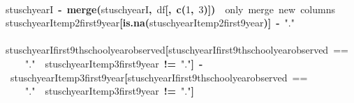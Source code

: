 \documentclass[12pt]{article}
\makeatletter
\newcommand{\hlnumber}[1]{\textcolor[rgb]{0,0,0}{#1}}%
\newcommand{\hlfunctioncall}[1]{\textcolor[rgb]{0.501960784313725,0,0.329411764705882}{\textbf{#1}}}%
\newcommand{\hlstring}[1]{\textcolor[rgb]{0.6,0.6,1}{#1}}%
\newcommand{\hlkeyword}[1]{\textcolor[rgb]{0,0,0}{\textbf{#1}}}%
\newcommand{\hlcomment}[1]{\textcolor[rgb]{0.180392156862745,0.6,0.341176470588235}{#1}}%
\newcommand{\hlassignement}[1]{\textcolor[rgb]{0,0,0}{\textbf{#1}}}%
\newcommand{\hlsymbol}[1]{\textcolor[rgb]{0,0,0}{#1}}%
\newcommand{\hlstd}[1]{\textcolor[rgb]{0,0,0}{#1}}%
\newenvironment{kframe}{%
 \def\FrameCommand##1{\hskip\@totalleftmargin \hskip-\fboxsep
 \colorbox{shadecolor}{##1}\hskip-\fboxsep
     \hskip-\linewidth \hskip-\@totalleftmargin \hskip\columnwidth}%
 \MakeFramed {\advance\hsize-\width
   \@totalleftmargin\z@ \linewidth\hsize
   \@setminipage}}%
 {\par\unskip\endMakeFramed}
\newenvironment{knitrout}{}{} %
\renewenvironment{knitrout}{\begin{footnotesize}}{\end{footnotesize}}
\makeatother
\begin{document}
\begin{knitrout}
\begin{kframe}
\begin{flushleft}
\hlstd{}\hspace*{\fill}\\
\hlstd{}\hlsymbol{stuschyearI}{\ }\hlassignement{\usebox{\hlnormalsizeboxlessthan}-}{\ }\hlfunctioncall{merge}\hlkeyword{(}\hlsymbol{stuschyearI}\hlkeyword{,}{\ }\hlsymbol{df}\hlkeyword{[}\hlkeyword{,}{\ }\hlfunctioncall{c}\hlkeyword{(}\hlnumber{1}\hlkeyword{,}{\ }\hlnumber{3}\hlkeyword{)}\hlkeyword{]}\hlkeyword{)}{\ }{\ }\hlcomment{\usebox{\hlnormalsizeboxhash}{\ }only{\ }merge{\ }new{\ }columns}\hspace*{\fill}\\
\hlstd{}\hlsymbol{stuschyearI}\hlkeyword{\usebox{\hlnormalsizeboxdollar}}\hlsymbol{temp2\usebox{\hlnormalsizeboxunderscore}first9year}\hlkeyword{[}\hlfunctioncall{is.na}\hlkeyword{(}\hlsymbol{stuschyearI}\hlkeyword{\usebox{\hlnormalsizeboxdollar}}\hlsymbol{temp2\usebox{\hlnormalsizeboxunderscore}first9year}\hlkeyword{)}\hlkeyword{]}{\ }\hlassignement{\usebox{\hlnormalsizeboxlessthan}-}{\ }\hlstring{"{}."{}}\hspace*{\fill}\\
\hlstd{}\hspace*{\fill}\\
\hlstd{}\hlsymbol{stuschyearI}\hlkeyword{\usebox{\hlnormalsizeboxdollar}}\hlsymbol{first9thschoolyear\usebox{\hlnormalsizeboxunderscore}observed}\hlkeyword{[}\hlsymbol{stuschyearI}\hlkeyword{\usebox{\hlnormalsizeboxdollar}}\hlsymbol{first9thschoolyear\usebox{\hlnormalsizeboxunderscore}observed}{\ }==\hspace*{\fill}\\
\hlstd{}{\ }{\ }{\ }{\ }\hlstring{"{}."{}}{\ }\hlkeyword{\usebox{\hlnormalsizeboxand}}{\ }\hlsymbol{stuschyearI}\hlkeyword{\usebox{\hlnormalsizeboxdollar}}\hlsymbol{temp3\usebox{\hlnormalsizeboxunderscore}first9year}{\ }\hlkeyword{!=}{\ }\hlstring{"{}."{}}\hlkeyword{]}{\ }\hlassignement{\usebox{\hlnormalsizeboxlessthan}-}{\ }\hlsymbol{stuschyearI}\hlkeyword{\usebox{\hlnormalsizeboxdollar}}\hlsymbol{temp3\usebox{\hlnormalsizeboxunderscore}first9year}\hlkeyword{[}\hlsymbol{stuschyearI}\hlkeyword{\usebox{\hlnormalsizeboxdollar}}\hlsymbol{first9thschoolyear\usebox{\hlnormalsizeboxunderscore}observed}{\ }==\hspace*{\fill}\\
\hlstd{}{\ }{\ }{\ }{\ }\hlstring{"{}."{}}{\ }\hlkeyword{\usebox{\hlnormalsizeboxand}}{\ }\hlsymbol{stuschyearI}\hlkeyword{\usebox{\hlnormalsizeboxdollar}}\hlsymbol{temp3\usebox{\hlnormalsizeboxunderscore}first9year}{\ }\hlkeyword{!=}{\ }\hlstring{"{}."{}}\hlkeyword{]}\hspace*{\fill}\\

\end{flushleft}
\end{kframe}
\end{knitrout}
\end{document}

